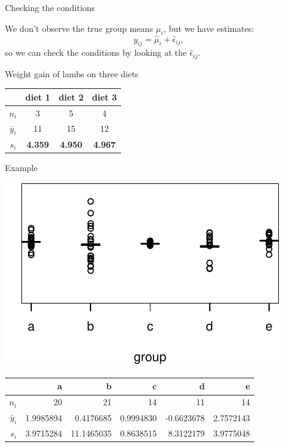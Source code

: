 \begin{frame}{Checking the conditions}

    We don't observe the true group means $\mu_i$,
    but we have estimates:
    \[
        y_{ij} = \hat \mu_i + \hat \epsilon_{ij} ,
    \]
    so we can check the conditions by looking at the $\hat \epsilon_{ij}$.


    \pause
    \vspace{2em}

    Weight gain of lambs on three diets
    \begin{center}
        \begin{tabular}{cccc}
            & diet 1 & diet 2 & diet 3 \\
            \hline
            $n_i$ & 3 & 5 & 4 \\
            $\bar y_i$ & 11 & 15 & 12 \\
            \textbf{$s_i$} & \textbf{4.359} & \textbf{4.950} & \textbf{4.967} \\
        \end{tabular}
    \end{center}

\end{frame}


\begin{frame}{Example}

    \begin{center}
        \includegraphics{ex23-1.pdf}
    \end{center}
    



    \begin{center}
\begin{tabular}{rrrrrr}
  \hline
  & a & b & c & d & e \\ 
  \hline
  $n_i$ &  20 & 21 & 14 & 11 & 14 \\
  $\bar y_i$ & 1.9985894 & 0.4176685 & 0.9994830 & -0.6623678 & 2.7572143 \\
  $s_i$ & 3.9715284 & 11.1465035 & 0.8638515 & 8.3122179 & 3.9775048 \\
   \hline
\end{tabular}
    \end{center}
\end{frame}


